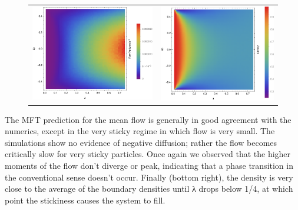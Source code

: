 \begin{figure}[h!]
\begin{center}
\begin{tabular}{c|c}
    \includegraphics[width=0.5\linewidth]{../tex-src/images/constDens/varFlow-crop} & \includegraphics[width=0.5\linewidth]{../tex-src/images/constDens/meanDens-crop} \\
    \end{tabular}
\end{center}
    \vspace{-0em}
\end{figure}

The MFT prediction for the mean flow is generally in good agreement with the numerics, except in the very sticky regime in which flow is very small.
The simulations show no evidence of negative diffusion; rather the flow becomes critically slow for very sticky particles.
Once again we observed that the higher moments of the flow don't diverge or peak, indicating that a phase transition in the conventional sense doesn't occur.
Finally (bottom right), the density is very close to the average of the boundary densities until λ drops below 1/4, at which point the stickiness causes the system to fill.


